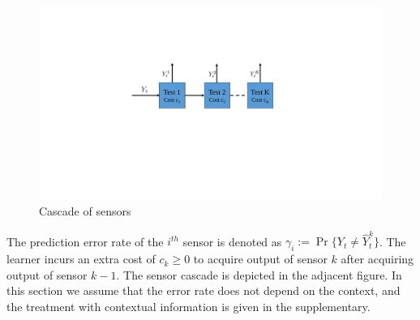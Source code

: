 \begin{figure}
	\vspace{-.5cm}
	\centering
	\includegraphics[scale=.6]{../Figures/cascade.pdf}
	\caption{Cascade of sensors
	}\label{wrap-fig:1}
	\vspace{-.5cm}
\end{figure} 

The prediction error rate of the $i^{th}$ sensor is denoted as $\gamma_i:=\Pr\{Y_t\neq \hat{Y}^k_t\}$. The learner incurs an extra cost of $c_k\geq 0$ to acquire output of sensor $k$ after acquiring output of sensor $k-1$. The sensor cascade is depicted in the adjacent figure. In this section we assume that the error rate does not depend on the  context, and the treatment with contextual information is given in the supplementary. 
\fi


